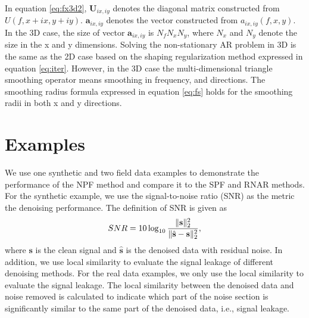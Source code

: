 In equation \ref{eq:fx3d2}, $\mathbf{U}_{ix,iy}$ denotes the diagonal matrix constructed from $U(f,x+ix,y+iy)$. $\mathbf{a}_{ix,iy}$ denotes the vector constructed from $a_{ix,iy}(f,x,y)$. In the 3D case, the size of vector $\mathbf{a}_{ix,iy}$ is $N_fN_xN_y$, where $N_x$ and $N_y$ denote the size in the x and y dimensions. Solving the non-stationary AR problem in 3D is the same as the 2D case based on the shaping regularization method expressed in equation \ref{eq:iter}. However, in the 3D case the multi-dimensional triangle smoothing operator means smoothing in frequency, and  directions.  The smoothing radius formula expressed in equation \ref{eq:fs} holds for the smoothing radii in both x and y directions.   


\section{Examples}
We use one synthetic and two field data examples to demonstrate the performance of the NPF method and compare it to the SPF and RNAR methods. For the synthetic example, we use the signal-to-noise ratio (SNR) as the metric  the denoising performance. The definition of SNR is given as
\begin{equation}
\label{eq:diff}
SNR=10\log_{10}\frac{\Arrowvert \mathbf{s} \Arrowvert_2^2}{\Arrowvert \hat{\mathbf{s}} -\mathbf{s}\Arrowvert_2^2},
\end{equation}
where $\mathbf{s}$ is the clean signal and $\hat{\mathbf{s}}$ is the denoised data with residual noise. In addition, we use local similarity \cite[]{fomel2007localattr,yangkang2015ortho} to evaluate the signal leakage of different denoising methods. For the real data examples, we only use the local similarity to evaluate the signal leakage. The local similarity between the denoised data and noise removed is calculated to indicate which part of the noise section is significantly similar to the same part of the denoised data, i.e., signal leakage.


